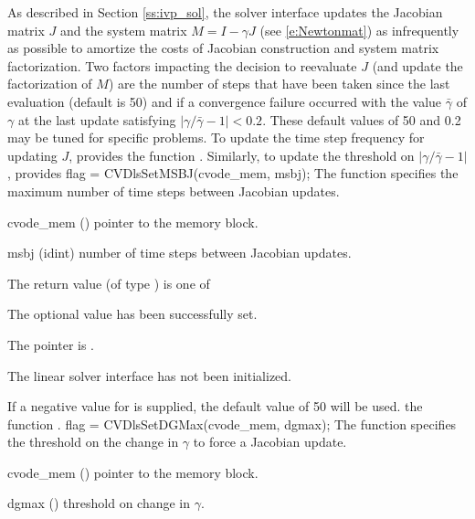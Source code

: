As described in Section \ref{ss:ivp_sol}, the
{\cvdls} solver interface updates the Jacobian matrix $J$ and the
system matrix $M = I - \gamma J$ (see \ref{e:Newtonmat}) as
infrequently as possible to amortize the costs of Jacobian
construction and system matrix factorization.  Two factors impacting
the decision to reevaluate $J$ (and update the factorization
of $M$) are the number of steps that have been taken since the last
evaluation (default is 50) and if a convergence failure
occurred with the value $\bar{\gamma}$ of $\gamma$ at the last update
satisfying $|\gamma/\bar{\gamma} - 1| < 0.2$.  These default values of
50 and 0.2 may be tuned for specific problems.
To update the time step frequency for updating $J$, {\cvdls} provides 
the function .
Similarly, to update the threshold on $|\gamma/\bar{\gamma} - 1|$,
{\cvdls} provides
{
  flag = CVDlsSetMSBJ(cvode\_mem, msbj);
}
{
  The function  specifies the maximum number of time
  steps between Jacobian updates.
}
{
  \begin{args}
  \item[cvode\_mem] ()
    pointer to the {\cvode} memory block.
  \item[msbj] (id{int})
    number of time steps between Jacobian updates.
  \end{args}
}
{
  The return value  (of type ) is one of
  \begin{args}
  \item[\Id{CVDLS\_SUCCESS}] 
    The optional value has been successfully set.
  \item[\Id{CVDLS\_MEM\_NULL}]
    The  pointer is .
  \item[\Id{CVDLS\_LMEM\_NULL}]
    The {\cvdls} linear solver interface has not been initialized.
  \end{args}
}
{
  If a negative value for  is supplied, the default value of
  50 will be used.
}
the function .
{
  flag = CVDlsSetDGMax(cvode\_mem, dgmax);
}
{
  The function  specifies the threshold on the
  change in $\gamma$ to force a Jacobian update.
}
{
  \begin{args}
  \item[cvode\_mem] ()
    pointer to the {\cvode} memory block.
  \item[dgmax] ()
    threshold on change in $\gamma$.
  \end{args}
}
